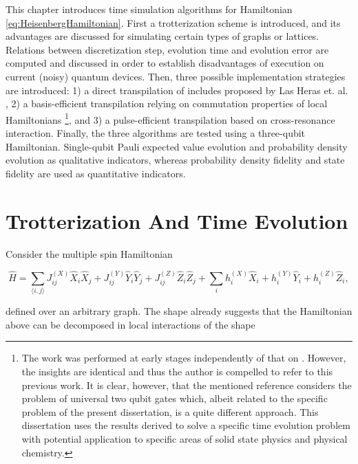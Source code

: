 This chapter introduces time simulation algorithms for Hamiltonian \ref{eq:HeisenbergHamiltonian}. First a trotterization scheme is introduced, and its advantages are discussed for simulating certain types of graphs or lattices. Relations between discretization step, evolution time and evolution error are computed and discussed in order to establish disadvantages of execution on current (noisy) quantum devices. Then, three possible implementation strategies are introduced: 1) a direct transpilation of includes proposed by Las Heras et. al. \cite{HubbardSimulLasHeras}, 2) a basis-efficient transpilation relying on commutation properties of local Hamiltonians \footnote{The work was performed at early stages independently of that on \cite{BellUniversalCartan}. However, the insights are identical and thus the author is compelled to refer to this previous work. It is clear, however, that the mentioned reference considers the problem of universal two qubit gates which, albeit related to the specific problem of the present dissertation, is a quite different approach. This dissertation uses the results derived to solve a specific time evolution problem with potential application to specific areas of solid state physics and physical chemistry.}, and 3) a pulse-efficient transpilation based on cross-resonance interaction. Finally, the three algorithms are tested using a three-qubit Hamiltonian. Single-qubit Pauli expected value evolution and probability density evolution as qualitative indicators, whereas probability density fidelity and state fidelity are used as quantitative indicators.

\section{Trotterization And Time Evolution}
\label{sec:MainTrotterScheme}

  Consider the multiple spin Hamiltonian

  \begin{equation}
    \hat{H} = \sum_{\langle i,j \rangle} J_{ij}^{(X)} \hat{X}_i \hat{X}_j + J_{ij}^{(Y)} \hat{Y}_i \hat{Y}_j + J_{ij}^{(Z)} \hat{Z}_i \hat{Z}_j + \sum_i h_i^{(X)} \hat{X}_i + h_i^{(Y)} \hat{Y}_i + h_i^{(Z)} \hat{Z}_i,
    \label{eq:HeisenbergHamiltonian2}
  \end{equation}

  \noindent defined over an arbitrary graph. The shape already suggests that the Hamiltonian above can be decomposed in local interactions of the shape

